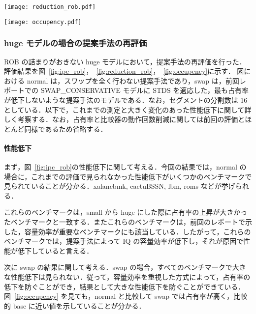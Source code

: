 \documentclass[twocolumn]{jsarticle}
\begin{document}
  \begin{figure*}[ht]
    \centering
    \texttt{[image: reduction\_rob.pdf]}
    \caption{提案手法における比較器の動作回数削減(hugeモデル)}
    \label{fig:reduction_rob}
  \end{figure*}

  \begin{figure*}[ht]
    \centering
    \texttt{[image: occupency.pdf]}
    \caption{提案手法における占有率の変化(hugeモデル)}
    \label{fig:occupency}
  \end{figure*}

  \subsubsection{huge モデルの場合の提案手法の再評価}
  \label{sec:hyouka}
  ROB の詰まりがおきない huge モデルにおいて，提案手法の再評価を行った．評価結果を図~\ref{fig:ipc_rob}，~\ref{fig:reduction_rob}，~\ref{fig:occupency}に示す．
  図における normal は，スワップを全く行わない提案手法であり，swap は，前回レポートでの SWAP\_CONSERVATIVE モデルに STDS を適応した，最も占有率が低下しないような提案手法のモデルである．なお，セグメントの分割数は 16 としている．以下で，これまでの測定と大きく変化のあった性能低下に関して詳しく考察する．なお，占有率と比較器の動作回数削減に関しては前回の評価とほとんど同様であるため省略する．
  
  \paragraph{性能低下}まず，図~\ref{fig:ipc_rob}の性能低下に関して考える．今回の結果では，normal の場合に，これまでの評価で見られなかった性能低下がいくつかのベンチマークで見られていることが分かる．xalancbmk, cactuBSSN, lbm, roms などが挙げられる．
  
  これらのベンチマークは，small から huge にした際に占有率の上昇が大きかったベンチマークと一致する．またこれらのベンチマークは，前回のレポートで示した，容量効率が重要なベンチマークにも該当している．したがって，これらのベンチマークでは，提案手法によって IQ の容量効率が低下し，それが原因で性能が低下していると言える． 

  次に swap の結果に関して考える．swap の場合，すべてのベンチマークで大きな性能低下は見られない．従って，容量効率を重視した方式によって，占有率の低下を防ぐことができ，結果として大きな性能低下を防ぐことができている．図~\ref{fig:occupency} を見ても，normal と比較して swap では占有率が高く，比較的 base に近い値を示していることが分かる．
\end{document}
